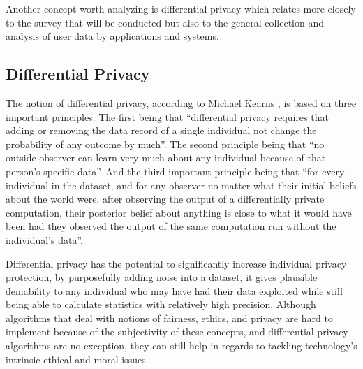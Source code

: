 Another concept worth analyzing is differential privacy which relates more
closely to the survey that will be conducted but also to the general
collection and analysis of user data by applications and systems.

\subsection{Differential Privacy}

The notion of differential privacy, according to Michael Kearns \cite{kearns2019ethical},
is based on three important principles. The first being that ``differential
privacy requires that adding or removing the data record of a single individual
not change the probability of any outcome by much''. The second principle
being that ``no outside observer can learn very much about any individual
because of that person's specific data''. And the third important principle
being that ``for every individual in the dataset, and for any observer no
matter what their initial beliefs about the world were, after observing
the output of a differentially private computation, their posterior belief
about anything is close to what it would have been had they observed the
output of the same computation run without the individual's data''.

Differential privacy has the potential to significantly increase individual
privacy protection, by purposefully adding noise into a dataset, it gives
plausible deniability to any individual who may have had their data exploited
while still being able to calculate statistics with relatively high precision.
Although algorithms that deal with notions of fairness, ethics, and privacy
are hard to implement because of the subjectivity of these concepts, and
differential privacy algorithms are no exception, they can still help in
regards to tackling technology's intrinsic ethical and moral issues.


